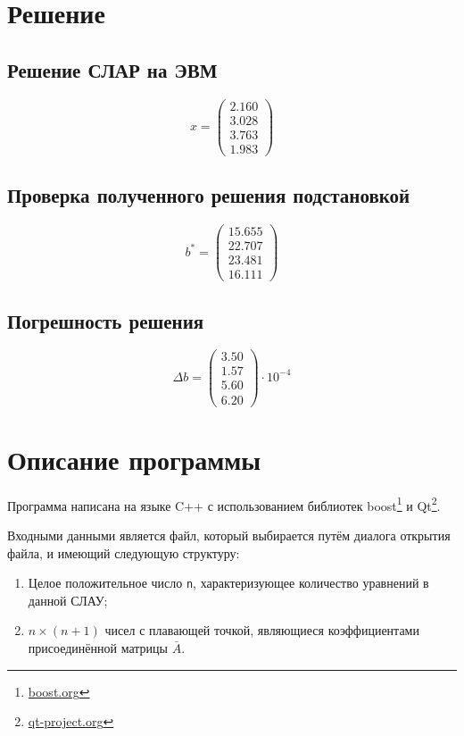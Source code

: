 \documentclass[a4paper,12pt,notitlepage,headsepline,pdftex]{scrartcl}
\begin{document}
\section{Решение}
  \subsection{Решение СЛАР на ЭВМ}
    \begin{equation}
      x = \left( \begin{matrix}
        2.160\\
        3.028\\
        3.763\\
        1.983
      \end{matrix}\right)
      \label{eq:x}
    \end{equation}
  \subsection{Проверка полученного решения подстановкой}
    \begin{equation}
      b^* = \left( \begin{matrix}
        15.655\\
        22.707\\
        23.481\\
        16.111
      \end{matrix}\right)
      \label{eq:b_ast}
    \end{equation}
  \subsection{Погрешность решения}
    \begin{equation}
      \Delta b = \left( \begin{matrix}
        3.50\\
        1.57\\
        5.60\\
        6.20
      \end{matrix}\right) \cdot 10^{-4}
      \label{eq:delta}
    \end{equation}
\newpage
\section{Описание программы}
  Программа написана на языке C++ с использованием библиотек
  boost\footnote{\url{boost.org}} и Qt\footnote{\url{qt-project.org}}.

  Входными данными является файл, который выбирается путём диалога открытия
  файла, и имеющий следующую структуру:
  \begin{enumerate}
    \item Целое положительное число \verb'n', характеризующее количество
      уравнений в данной СЛАУ;
    \item $n \times (n+1)$ чисел с плавающей точкой, являющиеся коэффициентами
      присоединённой матрицы $\bar{A}$.
  \end{enumerate}
\end{document}
